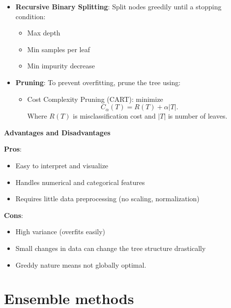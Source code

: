\documentclass[11pt]{article}
\begin{document}
\begin{itemize}
	\item \textbf{Recursive Binary Splitting}: Split nodes greedily until a stopping condition:
		\begin{itemize}
			\item Max depth
			\item Min samples per leaf
			\item Min impurity decrease
\end{itemize}
		
	\item \textbf{Pruning}: To prevent overfitting, prune the tree using:
		\begin{itemize}
			\item Cost Complexity Pruning (CART): minimize
			\[
				C_{\alpha}(T) = R(T) + \alpha|T|
			.\] 
			Where $R(T)$ is misclassification cost and $|T|$ is number of leaves. 
		\end{itemize}
\end{itemize}

\textbf{Advantages and Disadvantages}

\begin{minipage}[T]{0.5\textwidth}

\textbf{Pros}:
\begin{itemize}
	\item Easy to interpret and visualize
	\item Handles numerical and categorical features
	\item Requires little data preprocessing (no scaling, normalization)
\end{itemize}
\end{minipage}
\begin{minipage}[T]{0.5\textwidth}

\textbf{Cons}:
\begin{itemize}
	\item High variance (overfits easily)
	\item Small changes in data can change the tree structure drastically
	\item Greddy nature means not globally optimal.
\end{itemize}
\end{minipage}

\section*{Ensemble methods}
\end{document}
